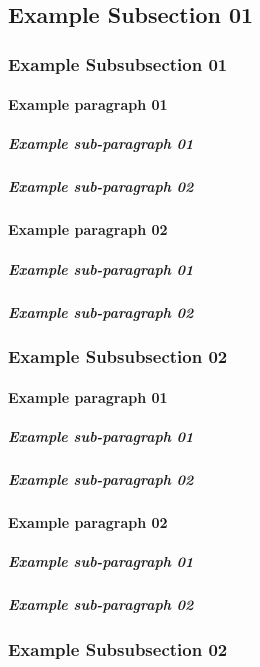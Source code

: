 	\subsection{Example Subsection 01}
		\subsubsection{Example Subsubsection 01}
			\paragraph{Example paragraph 01}
				\subparagraph{Example sub-paragraph 01}
				\subparagraph{Example sub-paragraph 02}
			\paragraph{Example paragraph 02}
				\subparagraph{Example sub-paragraph 01}
				\subparagraph{Example sub-paragraph 02}
		\subsubsection{Example Subsubsection 02}
			\paragraph{Example paragraph 01}
				\subparagraph{Example sub-paragraph 01}
				\subparagraph{Example sub-paragraph 02}
			\paragraph{Example paragraph 02}
				\subparagraph{Example sub-paragraph 01}
				\subparagraph{Example sub-paragraph 02}
		\subsubsection{Example Subsubsection 02}
